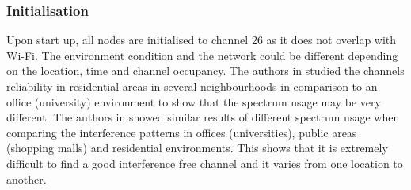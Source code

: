 \subsubsection{Initialisation}

Upon start up, all nodes are initialised to channel 26 as it does not overlap with Wi-Fi. 
The environment condition and the network could be different depending on the location, time and channel occupancy. 
The authors in \cite{homearea} studied the channels reliability in residential areas in several neighbourhoods in comparison to an office (university) environment to show that the spectrum usage may be very different.
The authors in \cite{oppcast} showed similar results of different spectrum usage when comparing the interference patterns in offices (universities), public areas (shopping malls) and residential environments.
This shows that it is extremely difficult to find a good interference free channel and it varies from one location to another.


